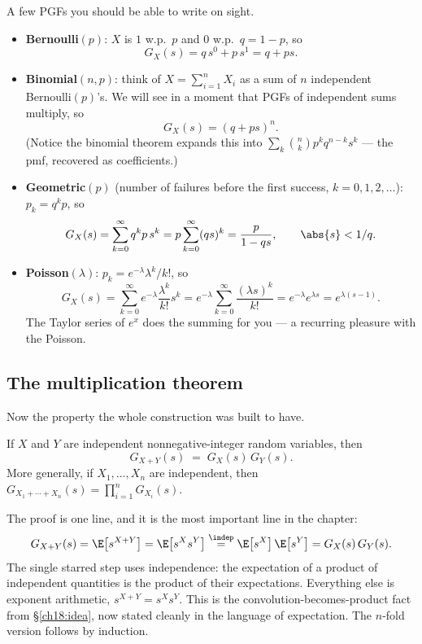 \begin{example}
\label{ch18:ex-pgfs}
A few PGFs you should be able to write on sight.
\begin{itemize}
  \item \textbf{Bernoulli}$(p)$: $X$ is $1$ w.p.\ $p$ and $0$ w.p.\ $q=1-p$, so
        \[
          G_X(s) = q\,s^0 + p\,s^1 = q + p s .
        \]
  \item \textbf{Binomial}$(n,p)$: think of $X=\sum_{i=1}^n X_i$ as a sum of $n$
        independent Bernoulli$(p)$'s. We will see in a moment that PGFs of
        independent sums multiply, so
        \[
          G_X(s) = (q+ps)^n .
        \]
        (Notice the binomial theorem expands this into
        $\sum_k \binom{n}{k}p^k q^{n-k}s^k$ --- the pmf, recovered as
        coefficients.)
  \item \textbf{Geometric}$(p)$ (number of failures before the first success,
        $k=0,1,2,\dots$): $p_k = q^k p$, so
        \[
          G_X(s) = \sum_{k=0}^\infty q^k p\, s^k
                 = p\sum_{k=0}^\infty (qs)^k = \frac{p}{1-qs},
          \qquad \abs{s}<1/q .
        \]
  \item \textbf{Poisson}$(\lambda)$: $p_k = e^{-\lambda}\lambda^k/k!$, so
        \[
          G_X(s) = \sum_{k=0}^\infty e^{-\lambda}\frac{\lambda^k}{k!}s^k
                 = e^{-\lambda}\sum_{k=0}^\infty \frac{(\lambda s)^k}{k!}
                 = e^{-\lambda}e^{\lambda s} = e^{\lambda(s-1)} .
        \]
        The Taylor series of $e^x$ does the summing for you --- a recurring
        pleasure with the Poisson.
\end{itemize}
\end{example}

\subsection{The multiplication theorem}

Now the property the whole construction was built to have.

\begin{theorem}
\label{ch18:thm-pgf-product}
If $X$ and $Y$ are independent nonnegative-integer random variables, then
\[
  G_{X+Y}(s) \;=\; G_X(s)\,G_Y(s).
\]
More generally, if $X_1,\dots,X_n$ are independent, then $G_{X_1+\cdots+X_n}(s)
= \prod_{i=1}^n G_{X_i}(s)$.
\end{theorem}

\begin{whybox}
The proof is one line, and it is the most important line in the chapter:
\[
  G_{X+Y}(s) = \E\!\left[s^{X+Y}\right]
             = \E\!\left[s^{X}s^{Y}\right]
             \stackrel{\indep}{=} \E\!\left[s^{X}\right]\E\!\left[s^{Y}\right]
             = G_X(s)\,G_Y(s).
\]
The single starred step uses independence: the expectation of a product of
independent quantities is the product of their expectations. Everything else is
exponent arithmetic, $s^{X+Y}=s^X s^Y$. This is the convolution-becomes-product
fact from \S\ref{ch18:idea}, now stated cleanly in the language of expectation.
The $n$-fold version follows by induction.
\end{whybox}


